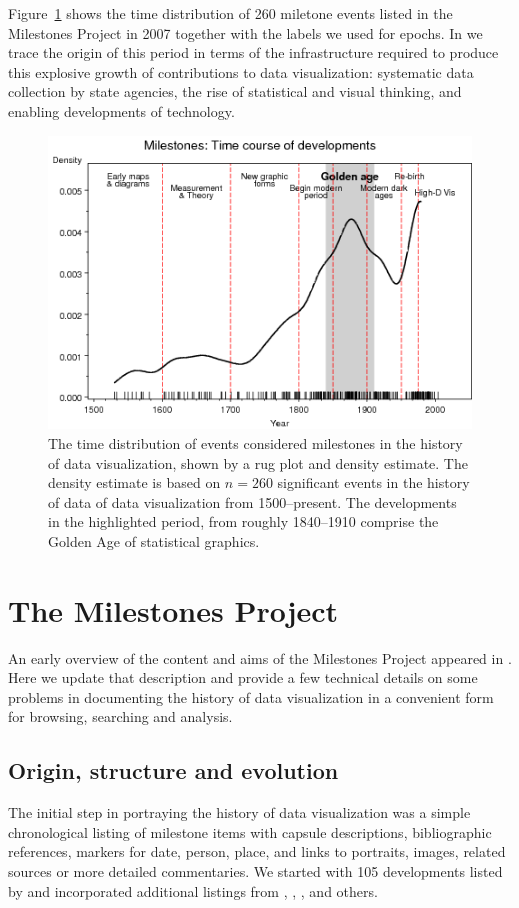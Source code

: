 \documentclass[11pt]{article}
\newcommand*{\figref}[1]{Figure~\ref{#1}}
\begin{document}
\figref{fig:mileyears4} shows the time distribution of 260 miletone events
listed in the Milestones Project in 2007 together with the labels we used for
epochs.
In \citet{Friendly:2008:golden} we trace the origin of this period in terms
of the infrastructure required to produce this explosive growth of contributions
to data visualization: systematic data collection by state agencies,
the rise of statistical and visual thinking, and enabling  developments of
technology.
\begin{figure}[!htb]
  \centering
  \includegraphics[width=.9\textwidth,clip]{fig/mileyears4}
  \caption{The time distribution of events considered milestones in the history of
  data visualization, shown by a rug plot and
  density estimate.
  The density estimate is based on $n=260$ significant events in the history of data
  of data visualization from 1500--present.
  The developments in the highlighted period, from roughly 1840--1910 comprise the
  Golden Age of statistical graphics.
  }
  \label{fig:mileyears4}
\end{figure}



\section{The Milestones Project}\label{sec:project}
An early overview of the content and aims of the Milestones Project appeared in \cite{Friendly:04:gfkl}.
Here we update that description and provide a few technical details on some problems in
documenting the history of data visualization in a convenient form for browsing, searching and
analysis.

\subsection{Origin, structure and evolution}\label{sec:structure}
The initial step in portraying the history of data visualization was a simple chronological listing of milestone items
with capsule descriptions, bibliographic references, markers for date, person, place, and links to portraits, images,
related sources or more detailed commentaries.
We started with 105
developments listed by \citet{BenigerRobyn:1978}
and incorporated additional listings from
\citet{Hankins:1999},  \citet{Tufte:1983,Tufte:1990,Tufte:1997},  \citet{Heiser:2000}, and others.
\end{document}
